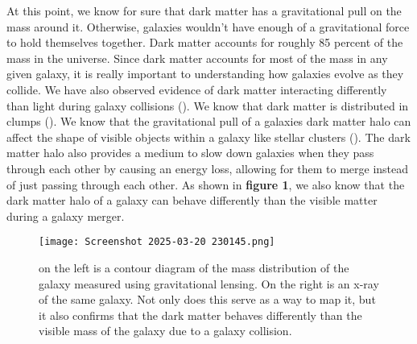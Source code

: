 \documentclass[fleqn,usenatbib]{mnras}
\begin{document}
        At this point, we know for sure that dark matter has a gravitational pull on the mass around it. Otherwise, galaxies wouldn't have enough of a gravitational force to hold themselves together. Dark matter accounts for roughly 85 percent of the mass in the universe. Since dark matter accounts for most of the mass in any given galaxy, it is really important to understanding how galaxies evolve as they collide. We have also observed evidence of dark matter interacting differently than light during galaxy collisions (\citet{Clowe2006}). We know that dark matter is distributed in clumps (\citet{Banik2018}). We know that the gravitational pull of a galaxies dark matter halo can affect the shape of visible objects within a galaxy like stellar clusters (\citet{Erkal2017}). The dark matter halo also provides a medium to slow down galaxies when they pass through each other by causing an energy loss, allowing for them to merge instead of just passing through each other. As shown in \textbf{figure 1}, we also know that the dark matter halo of a galaxy can behave differently than the visible matter during a galaxy merger.
        
\begin{figure}
                \centering
                \texttt{[image: Screenshot 2025-03-20 230145.png]}
                \label{fig:enter-label}
            \caption{on the left is a contour diagram of the mass distribution of the galaxy measured using gravitational lensing. On the right is an x-ray of the same galaxy. Not only does this serve as a way to map it, but it also confirms that the dark matter behaves differently than the visible mass of the galaxy due to a galaxy collision.}
            \end{figure}
                        
\end{document}
